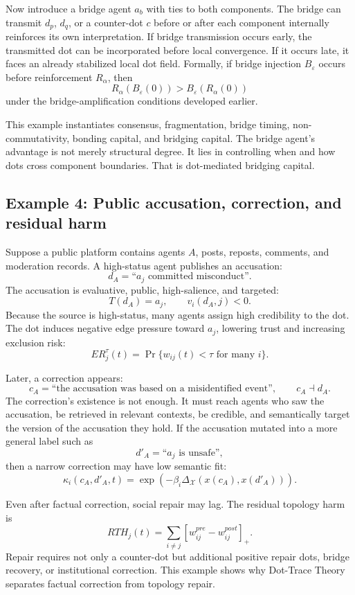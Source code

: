 \documentclass[11pt]{article}
\theoremstyle{remark}
\begin{document}
Now introduce a bridge agent $a_b$ with ties to both components. The bridge can transmit $d_p$, $d_q$, or a counter-dot $c$ before or after each component internally reinforces its own interpretation. If bridge transmission occurs early, the transmitted dot can be incorporated before local convergence. If it occurs late, it faces an already stabilized local dot field. Formally, if bridge injection $B_\varepsilon$ occurs before reinforcement $R_\alpha$, then
\[
R_\alpha(B_\varepsilon(0))>B_\varepsilon(R_\alpha(0))
\]
under the bridge-amplification conditions developed earlier.

This example instantiates consensus, fragmentation, bridge timing, non-commutativity, bonding capital, and bridging capital. The bridge agent's advantage is not merely structural degree. It lies in controlling when and how dots cross component boundaries. That is dot-mediated bridging capital.

\subsection{Example 4: Public accusation, correction, and residual harm}\label{example-public-accusation-correction}

Suppose a public platform contains agents $A$, posts, reposts, comments, and moderation records. A high-status agent publishes an accusation:
\[
d_A=\text{``}a_j\text{ committed misconduct''}.
\]
The accusation is evaluative, public, high-salience, and targeted:
\[
T(d_A)=a_j,\qquad v_i(d_A,j)<0.
\]
Because the source is high-status, many agents assign high credibility to the dot. The dot induces negative edge pressure toward $a_j$, lowering trust and increasing exclusion risk:
\[
ER_j^\tau(t)=\Pr\{w_{ij}(t)<\tau \text{ for many } i\}.
\]

Later, a correction appears:
\[
c_A=\text{``the accusation was based on a misidentified event''},\qquad c_A\dashv d_A.
\]
The correction's existence is not enough. It must reach agents who saw the accusation, be retrieved in relevant contexts, be credible, and semantically target the version of the accusation they hold. If the accusation mutated into a more general label such as
\[
d'_A=\text{``}a_j\text{ is unsafe''},
\]
then a narrow correction may have low semantic fit:
\[
\kappa_i(c_A,d'_A,t)=\exp(-\beta_i\Delta_{\mathcal X}(x(c_A),x(d'_A))).
\]

Even after factual correction, social repair may lag. The residual topology harm is
\[
RTH_j(t)=\sum_{i\neq j}[w_{ij}^{pre}-w_{ij}^{post}]_+.
\]
Repair requires not only a counter-dot but additional positive repair dots, bridge recovery, or institutional correction. This example shows why Dot-Trace Theory separates factual correction from topology repair.
\end{document}
